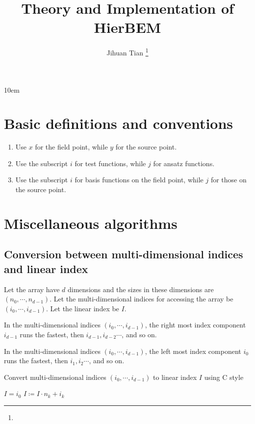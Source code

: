 \documentclass[11pt, a4paper]{article}
\begin{document}
\emergencystretch 10em
\title{Theory and Implementation of HierBEM}
\author{Jihuan Tian \footnote{\myemail}}
\maketitle
\tableofcontents

\section{Basic definitions and conventions}

\begin{enumerate}
\item Use $x$ for the field point, while $y$ for the source point.
\item Use the subscript $i$ for test functions, while $j$ for ansatz functions.
\item Use the subscript $i$ for basis functions on the field point, while $j$ for those on
  the source point.
\end{enumerate}

\section{Miscellaneous algorithms}

\subsection{Conversion between multi-dimensional indices and linear index}

Let the array have $d$ dimensions and the sizes in these dimensions are
$(n_0, \cdots, n_{d-1})$. Let the multi-dimensional indices for accessing the array be
$(i_0, \cdots, i_{d-1})$. Let the linear index be $I$.

\begin{Definition}  
  In the multi-dimensional indices $(i_0,\cdots,i_{d-1})$, the right most index component
  $i_{d-1}$ runs the fastest, then $i_{d-1}, i_{d-2} \cdots$, and so on.
\end{Definition}

\begin{Definition}
  In the multi-dimensional indices $(i_0,\cdots,i_{d-1})$, the left most index component
  $i_{0}$ runs the fastest, then $i_1, i_2 \cdots$, and so on.
\end{Definition}

\begin{breakablealgorithm}
  \caption{Convert multi-dimensional indices $(i_0,\cdots,i_{d-1})$ to linear index $I$ using C style}
  \begin{algorithmic}[1]
    \State $I = i_0$
      \State $I \coloneqq I \cdot n_k + i_k$
    \EndFor
  \end{algorithmic}
\end{breakablealgorithm}
\end{document}
